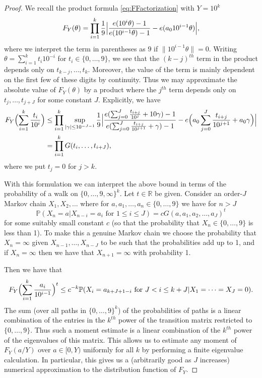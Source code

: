 \documentclass[10pt]{amsart}
\theoremstyle{plain}
\numberwithin{sblmm}{thrm}
\numberwithin{equation}{section}
\begin{document}
%
%
%
%
\begin{proof}
%
We recall the product formula \eqref{eq:FFactorization} with $Y=10^k$
\[
F_{Y}(\theta)=\prod_{i=1}^k\frac{1}{9}\Bigl|\frac{e(10^i\theta)-1}{e(10^{i-1}\theta)-1}-e(a_010^{i-1}\theta)\Bigr|,
\]
where we interpret the term in parentheses as $9$ if $\|10^{i-1}\theta\|=0$. Writing $\theta=\sum_{i=1}^k t_i 10^{-i}$ for $t_i\in\{0,\dots,9\}$, we see that the $(k-j)^{th}$ term in the product depends only on $t_{k-j},\dots,t_k$. Moreover, the value of the term is mainly dependent on the first few of these digits by continuity. Thus we may approximate the absolute value of $F_Y(\theta)$ by a product where the $j^{th}$ term depends only on $t_{j},\dots,t_{j+J}$ for some constant $J$. Explicitly, we have
%
\begin{align*}
F_{Y}\Bigl(\sum_{i=1}^{k}\frac{t_i}{10^i}\Bigr)
&\le \prod_{i=1}^k\sup_{|\gamma|\le 10^{-J-1} }\frac{1}{9}\Bigl|\frac{e(\sum_{j=0}^{J}\frac{t_{i+j}}{10^{j}}+10\gamma)-1}{e(\sum_{j=0}^{J}\frac{t_{i+j}}{10^{j+1}}+\gamma)-1}-e\Bigl(a_0\sum_{j=0}^{J}\frac{t_{i+j}}{10^{j+1}}+a_0\gamma\Bigr)\Bigr|\\
&=\prod_{i=1}^k G(t_i,\dots,t_{i+J}),
\end{align*}
%
where we put $t_j=0$ for $j>k$.

With this formulation we can interpret the above bound in terms of the probability of a walk on $\{0,\dots,9,\infty\}^k$. Let $t\in\mathbb{R}$ be given. Consider an order-$J$ Markov chain $X_1,X_2,\dots$ where for $a,a_1,\dots,a_n\in\{0,\dots,9\}$ we have for $n>J$
\[
\mathbb{P}(X_{n}=a|X_{n-i}=a_i\text{ for }1\le i\le J)= c G(a,a_1,a_2,\dots,a_J)^t
\]
for some suitably small constant $c$ (so that the probability that $X_n\in\{0,\dots,9\}$ is less than 1). To make this a genuine Markov chain we choose the probability that $X_n=\infty$ given $X_{n-1},\dots,X_{n-J}$ to be such that the probabilities add up to 1, and if $X_n=\infty$ then we have that $X_{n+1}=\infty$ with probability 1.

Then we have that
\[
F_{Y}\Bigl(\sum_{i=1}^k\frac{a_i}{10^{i-1}}\Bigr)^t\le c^{-k}\mathbb{P}(X_i=a_{k+J+1-i}\text{ for }J< i\le k+J|X_1=\dots=X_J=0).
\]
The sum (over all paths in $\{0,\dots,9\}^k$) of the probabilities of paths is a linear combination of the entries in the $k^{th}$ power of the transition matrix restricted to $\{0,\dots,9\}$. Thus such a moment estimate is a linear combination of the $k^{th}$ power of the eigenvalues of this matrix. This allows us to estimate any moment of $F_{Y}(a/Y)$ over $a\in[0,Y)$ uniformly for all $k$ by performing a finite eigenvalue calculation. In particular, this gives us a (arbitrarily good as $J$ increases) numerical approximation to the distribution function of $F_Y$.


\end{proof}
\end{document}
